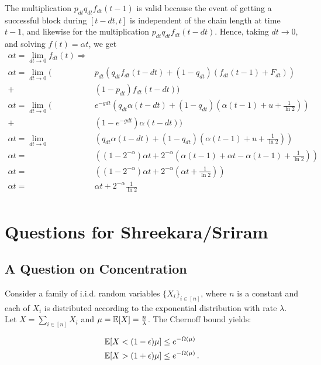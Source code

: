 The multiplication $p_{dt} q_{dt} f_{dt} (t - 1)$ is valid because the event of getting a successful block
during $[t - dt, t]$ is independent of the chain length at time $t - 1$, and likewise for the multiplication
$p_{dt} q_{dt} f_{dt}(t - dt)$.
Hence, taking $dt \to 0$, and solving $f(t) = \alpha t$, we get
\begin{align*}
  \alpha t = \lim_{dt \to 0} f_{dt}(t) \Rightarrow\\
  \alpha t = \lim_{dt \to 0} (&p_{dt}\left(q_{dt}f_{dt}(t - dt) + (1 - q_{dt})(f_{dt}(t - 1) + F_{dt})\right)\\ + &(1 - p_{dt})f_{dt}(t - dt))\\
  \alpha t = \lim_{dt \to 0} (&e^{-gdt}\left(q_{dt} \alpha (t - dt) + (1 - q_{dt})\left(\alpha (t - 1) + u + \frac{1}{\ln2}\right)\right)\\ + &(1 - e^{-gdt})\alpha (t - dt))\\
  \alpha t = \lim_{dt \to 0} &\left(q_{dt} \alpha (t - dt) + (1 - q_{dt})\left(\alpha (t - 1) + u + \frac{1}{\ln2}\right)\right)\\
  \alpha t = &\left((1 - 2^{-\alpha}) \alpha t + 2^{-\alpha}\left(\alpha (t - 1) + \alpha t - \alpha (t - 1) + \frac{1}{\ln2}\right)\right)\\
  \alpha t = &\left((1 - 2^{-\alpha}) \alpha t + 2^{-\alpha}\left(\alpha t + \frac{1}{\ln2}\right)\right)\\
  \alpha t = &\alpha t + 2^{-\alpha}\frac{1}{\ln2}\\
\end{align*}

\section{Questions for Shreekara/Sriram}

\subsection{A Question on Concentration}

Consider a family of i.i.d. random variables $\{ X_i \}_{i \in [n]}$, where $n$ is a constant
and each of $X_i$ is distributed according to the exponential distribution with rate $\lambda$.
Let $X = \sum_{i \in [n]} X_i$ and $\mu = \mathop{{}\mathbb{E}}[X] = \frac{n}{\lambda}$.
The Chernoff bound yields:

\begin{align*}
  \mathop{{}\mathbb{E}}[X < (1 - \epsilon)\mu] &\leq e^{-\Omega(\mu)}\\
  \mathop{{}\mathbb{E}}[X > (1 + \epsilon)\mu] &\leq e^{-\Omega(\mu)}\,.
\end{align*}

